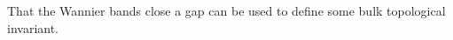 \documentclass{beamer}
\renewcommand{\(}{\left(}
\renewcommand{\)}{\right)}
\renewcommand{\[}{\left[}
\renewcommand{\]}{\right]}
\begin{document}
\begin{frame}
\begin{figure}[t]
    \end{figure}
    
    That the Wannier bands close a gap can be used to define some bulk topological invariant. 
\end{frame}
\end{document}
